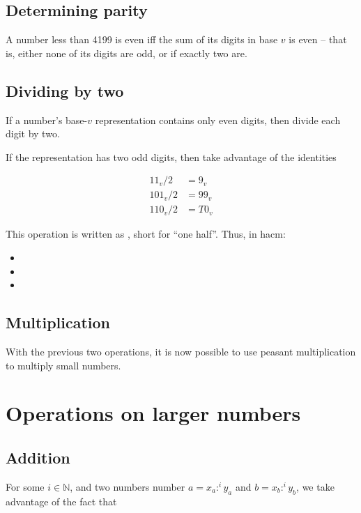 \documentclass{book}
\begin{document}
\subsection{Determining parity}

A number less than 4199 is even iff the sum of its digits in base $v$ is even -- that is, either none of its digits are odd, or if exactly two are.

\subsection{Dividing by two}

If a number's base-$v$ representation contains only even digits, then divide each digit by two.

If the representation has two odd digits, then take advantage of the identities

\begin{align*}
    11_v / 2 &= 9_v \\
    101_v / 2 &= 99_v \\
    110_v / 2 &= T0_v
\end{align*}

This operation is written as , short for  ``one half''. Thus, in hacm:

\begin{itemize}
    \item {}
    \item {}
    \item {}
\end{itemize}

\subsection{Multiplication}

With the previous two operations, it is now possible to use peasant multiplication to multiply small numbers.

\section{Operations on larger numbers}

\subsection{Addition}

For some $i \in \mathbb{N}$, and two numbers number $a = x_a :^i y_a$ and $b = x_b :^i y_b$, we take advantage of the fact that
\end{document}
